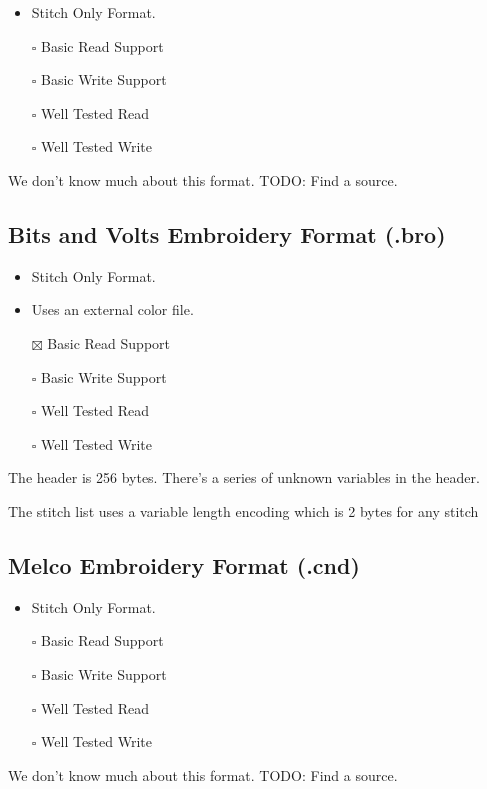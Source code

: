 \documentclass[onesize, a4paper]{refart}
\providecommand{\tightlist}{\setlength{\itemsep}{0pt}\setlength{\parskip}{0pt}}
\begin{document}
\begin{itemize}
\tightlist
\item Stitch Only Format.
\item[$\square$] Basic Read Support
\item[$\square$] Basic Write Support
\item[$\square$] Well Tested Read
\item[$\square$] Well Tested Write
\end{itemize}

We don't know much about this format. TODO: Find a source.

\subsection{Bits and Volts Embroidery Format (.bro)}

\begin{itemize}
\tightlist
\item Stitch Only Format.
\item Uses an external color file.
\item[$\boxtimes$] Basic Read Support
\item[$\square$] Basic Write Support
\item[$\square$] Well Tested Read
\item[$\square$] Well Tested Write
\end{itemize}

The header is 256 bytes. There's a series of unknown variables in the
header.

The stitch list uses a variable length encoding which is 2 bytes for any
stitch

\subsection{Melco Embroidery Format (.cnd)}

\begin{itemize}
\tightlist
\item Stitch Only Format.
\item[$\square$] Basic Read Support
\item[$\square$] Basic Write Support
\item[$\square$] Well Tested Read
\item[$\square$] Well Tested Write
\end{itemize}

We don't know much about this format. TODO: Find a source.
\end{document}
